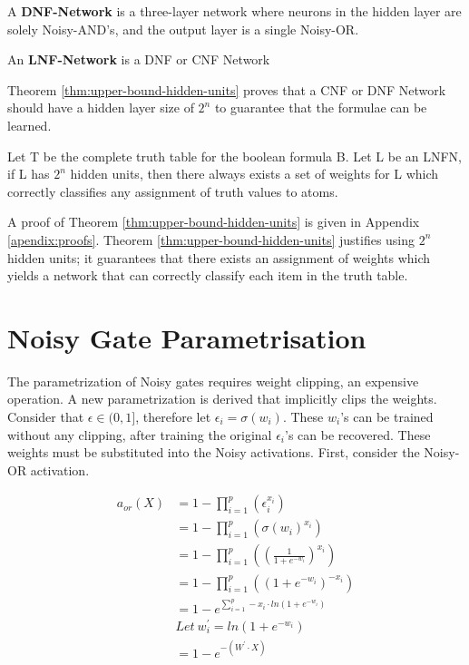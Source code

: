 \theoremstyle{definition}
\begin{definition} \label{def:dnf-network}
A \textbf{DNF-Network} is a three-layer network where neurons in the hidden layer are solely Noisy-AND's, and the output layer is a single Noisy-OR. 
\end{definition}

\theoremstyle{definition}
\begin{definition} \label{def:lnfn}
An \textbf{LNF-Network} is a DNF or CNF Network
\end{definition}

Theorem \ref{thm:upper-bound-hidden-units} proves that a CNF or DNF Network should have a hidden layer size of $2^n$ to guarantee that the formulae can be learned.

\begin{theorem}
Let T be the complete truth table for the boolean formula B. Let L be an LNFN, if L has $2^n$ hidden units, then there always exists a set of weights for L which correctly classifies any assignment of truth values to atoms.
\label{thm:upper-bound-hidden-units}
\end{theorem}

A proof of Theorem \ref{thm:upper-bound-hidden-units} is given in Appendix \ref{apendix:proofs}. Theorem \ref{thm:upper-bound-hidden-units} justifies using $2^n$ hidden units; it guarantees that there exists an assignment of weights which yields a network that can correctly classify each item in the truth table.

\section{Noisy Gate Parametrisation} \label{sec:real-noisy-parametrisation}
The parametrization of Noisy gates requires weight clipping, an expensive operation. A new parametrization is derived that implicitly clips the weights. Consider that $\epsilon \in (0, 1]$, therefore let $\epsilon_i = \sigma(w_i)$. These $w_i$'s can be trained without any clipping, after training the original $\epsilon_i$'s can be recovered. These weights must be substituted into the Noisy activations. First, consider the Noisy-OR activation.

\begin{align*}
a_{or}(X) &= 1 - \prod^p_{i=1}(\epsilon_i^{x_i})\\
&= 1 - \prod^p_{i=1}(\sigma(w_i)^{x_i})\\
&= 1 - \prod^p_{i=1}((\frac{1}{1 + e^{-w_i}})^{x_i})\\
&= 1 - \prod^p_{i=1}((1 + e^{-w_i})^{-x_i})\\
&= 1 - e^{\sum^p_{i=1} -x_i \cdot ln(1 + e^{-w_i})} \\
&Let\ w_i^{'} = ln(1 + e^{-w_i})\\
&= 1 - e^{-(W^{'} \cdot X)}
\end{align*}

